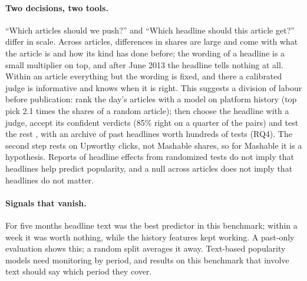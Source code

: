 \documentclass[10pt,a4paper,twocolumn]{article}
\begin{document}
\paragraph{Two decisions, two tools.} ``Which articles should we push?'' and ``Which headline should this article
get?'' differ in scale. Across articles, differences in shares are large and come with what the article is and how
its kind has done before; the wording of a headline is a small multiplier on top, and after June 2013 the headline
tells nothing at all. Within an article everything but the wording is fixed, and there a calibrated judge is
informative and knows when it is right. This suggests a division of labour before publication: rank the day's
articles with a model on platform history (top pick 2.1 times the shares of a random article); then choose the
headline with a judge, accept its confident verdicts (85\% right on a quarter of the pairs) and test the rest
\citep{li2026jev}, with an archive of past headlines worth hundreds of tests (RQ4). The second step rests on
Upworthy clicks, not Mashable shares, so for Mashable it is a hypothesis. Reports of headline effects from
randomized tests \citep{matias2021,gligoric2023,banerjee2025} do not imply that headlines help predict popularity,
and a null across articles does not imply that headlines do not matter.

\paragraph{Signals that vanish.} For five months headline text was the best predictor in this benchmark; within a
week it was worth nothing, while the history features kept working. A past-only evaluation shows this; a random
split averages it away. Text-based popularity models need monitoring by period, and results on this benchmark that
involve text should say which period they cover.
\end{document}
